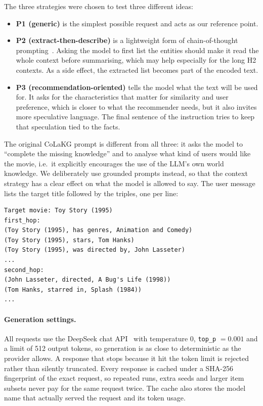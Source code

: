 \documentclass[a4paper,11pt]{article}
\begin{document}
The three strategies were chosen to test three different ideas:
\begin{itemize}
    \item \textbf{P1 (generic)} is the simplest possible request and acts as our reference point.
    \item \textbf{P2 (extract-then-describe)} is a lightweight form of chain-of-thought prompting~\cite{wei2022cot}. Asking the model to first list the entities should make it read the whole context before summarising, which may help especially for the long H2 contexts. As a side effect, the extracted list becomes part of the encoded text.
    \item \textbf{P3 (recommendation-oriented)} tells the model what the text will be used for. It asks for the characteristics that matter for similarity and user preference, which is closer to what the recommender needs, but it also invites more speculative language. The final sentence of the instruction tries to keep that speculation tied to the facts.
\end{itemize}
The original CoLaKG prompt is different from all three: it asks the model to ``complete the missing knowledge'' and to analyse what kind of users would like the movie, i.e.\ it explicitly encourages the use of the LLM's own world knowledge. We deliberately use grounded prompts instead, so that the context strategy has a clear effect on what the model is allowed to say. The user message lists the target title followed by the triples, one per line:

\begin{lstlisting}[language={}, caption={Format of the user message (H3 context, shortened)}, label={lst:user-message}]
Target movie: Toy Story (1995)
first_hop:
(Toy Story (1995), has genres, Animation and Comedy)
(Toy Story (1995), stars, Tom Hanks)
(Toy Story (1995), was directed by, John Lasseter)
...
second_hop:
(John Lasseter, directed, A Bug's Life (1998))
(Tom Hanks, starred in, Splash (1984))
...
\end{lstlisting}

\paragraph{Generation settings.} All requests use the DeepSeek chat API~\cite{deepseek2024v3} with temperature $0$, \texttt{top\_p} $=0.001$ and a limit of 512 output tokens, so generation is as close to deterministic as the provider allows. A response that stops because it hit the token limit is rejected rather than silently truncated. Every response is cached under a SHA-256 fingerprint of the exact request, so repeated runs, extra seeds and larger item subsets never pay for the same request twice. The cache also stores the model name that actually served the request and its token usage.
\end{document}
